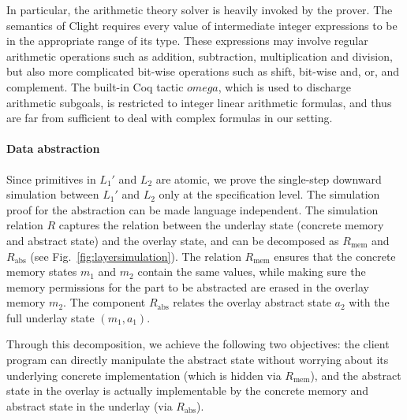 In particular, the arithmetic theory solver is heavily invoked by the
prover. The semantics of Clight requires every value of intermediate
integer expressions to be in the appropriate range of its type. These
expressions may involve regular arithmetic operations such as
addition, subtraction, multiplication and division, but also more
complicated bit-wise operations such as shift, bit-wise and, or, and
complement. The built-in Coq tactic $omega$, which is used to
discharge arithmetic subgoals, is restricted to integer linear
arithmetic formulas, and thus are far from sufficient to deal with
complex formulas in our setting.


\paragraph{Data abstraction}
Since primitives in $L_1'$ and $L_2$ are atomic, we prove the
single-step downward simulation between $L_1'$ and $L_2$ only at the
specification level.  The simulation proof for the abstraction can be
made language independent.  The simulation relation $R$ captures the
relation between the underlay state (concrete memory and abstract
state) and the overlay state, and can be decomposed as $R_\text{mem}$
and $R_\text{abs}$ (see Fig.~\ref{fig:layersimulation}). The relation
$R_\text{mem}$ ensures that the concrete memory states $m_1$ and $m_2$
contain the same values, while making sure the memory permissions for
the part to be abstracted are erased in the overlay memory $m_2$.  The
component $R_\text{abs}$ relates the overlay abstract state $a_2$ with
the full underlay state $(m_1, a_1)$.

Through this decomposition, we achieve the following two objectives:
the client program can directly manipulate the abstract state without
worrying about its underlying concrete implementation (which is hidden
via $R_\text{mem}$), and the abstract state in the overlay is actually
implementable by the concrete memory and abstract state in the
underlay (via $R_\text{abs}$).

